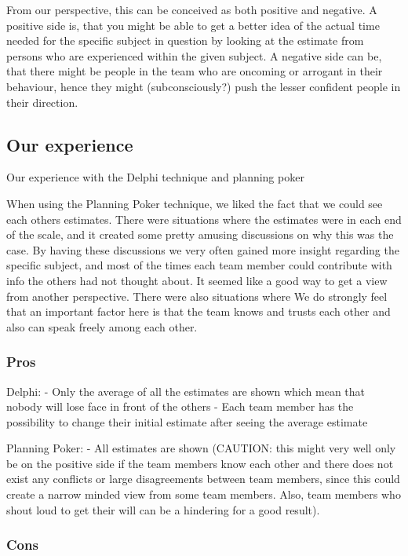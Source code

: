 From our perspective, this can be conceived as both positive and negative. A positive side is, that you might be able to get a better idea of the actual time needed for the specific subject in question by looking at the estimate from persons who are experienced within the given subject. A negative side can be, that there might be people in the team who are oncoming or arrogant in their behaviour, hence they might (subconsciously?) push the lesser confident people in their direction. 

\subsection{Our experience}

Our experience with the Delphi technique and planning poker


When using the Planning Poker technique, we liked the fact that we could see each others estimates. There were situations where the estimates were in each end of the scale, and it created some pretty amusing discussions on why this was the case. By having these discussions we very often gained more insight regarding the specific subject, and most of the times each team member could contribute with info the others had not thought about. It seemed like a good way to get a view from another perspective. There were also situations where We do strongly feel that an important factor here is that the team knows and trusts each other and also can speak freely among each other.

\subsubsection{Pros}

Delphi: 
- Only the average of all the estimates are shown which mean that nobody will lose face in front of the others
- Each team member has the possibility to change their initial estimate after seeing the average estimate

Planning Poker:
- All estimates are shown (CAUTION: this might very well only be on the positive side if the team members know each other and there does not exist any conflicts or large disagreements between team members, since this could create a narrow minded view from some team members. Also, team members who shout loud to get their will can be a hindering for a good result).

\subsubsection{Cons}

